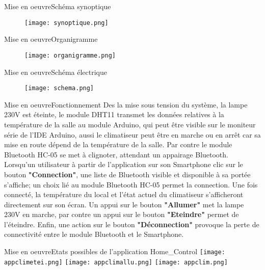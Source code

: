 \documentclass{beamer}
\begin{document}
	\begin{frame}{Mise en oeuvre}{Schéma synoptique}
		\begin{figure}\centering
			\texttt{[image: synoptique.png]}
		\end{figure}	
	\end{frame}
	
	\begin{frame}{Mise en oeuvre}{Organigramme}
		\begin{figure}
			\texttt{[image: organigramme.png]}
		\end{figure}
		
	\end{frame}
	
	\begin{frame}{Mise en oeuvre}{Schéma électrique}
		\begin{figure}\centering
			\texttt{[image: schema.png]}
		\end{figure}	
	\end{frame}
	
\begin{frame}{Mise en oeuvre}{Fonctionnement}
	Des la mise sous tension du système, la lampe 230V est éteinte, le module DHT11 transmet les données relatives à la température de la salle au module Arduino, qui peut être visible sur le moniteur série de l'IDE Arduino, aussi le climatiseur peut être en marche ou en arrêt car sa mise en route dépend de la température de la salle. Par contre le module Bluetooth HC-05 se met à clignoter, attendant un appairage Bluetooth. Lorsqu'un utilisateur à partir de l'application sur son Smartphone clic sur le bouton  \textbf{"Connection"}, une liste de Bluetooth visible et disponible à sa portée s'affiche; un choix lié au module Bluetooth HC-05 permet la connection. Une fois connecté, la température du local et l'état actuel du climatiseur s'afficheront directement sur son écran. Un appui sur le bouton \textbf{"Allumer"} met la lampe 230V en marche, par contre un appui sur le bouton \textbf{"Eteindre"} permet de l'éteindre. Enfin, une action sur le bouton \textbf{"Déconnection"} provoque la perte de connectivité entre le module Bluetooth et le Smartphone.
\end{frame}

	\begin{frame}{Mise en oeuvre}{Etats possibles de l'application Home\_Control}
	\centering
	\texttt{[image: appclimetei.png]}
	\texttt{[image: appclimallu.png]}
	\texttt{[image: appclim.png]}
	
\end{frame}
\end{document}
